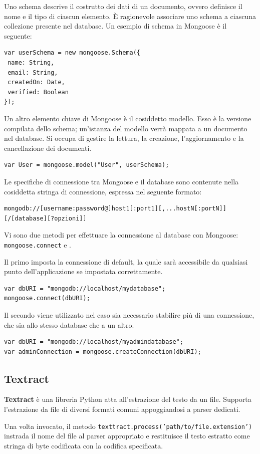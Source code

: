 Uno schema descrive il costrutto dei dati di un documento, ovvero definisce il nome e il tipo di ciascun elemento. È ragionevole associare uno schema a ciascuna collezione presente nel database. Un esempio di schema in Mongoose è il seguente:

\begin{lstlisting}
var userSchema = new mongoose.Schema({
 name: String,
 email: String,
 createdOn: Date,
 verified: Boolean
});
\end{lstlisting}

Un altro elemento chiave di Mongoose è il cosiddetto modello. Esso è la versione compilata dello schema; un'istanza del modello verrà mappata a un documento nel database. Si occupa di gestire la lettura, la creazione, l'aggiornamento e la cancellazione dei documenti.\cite{holmes}
\begin{lstlisting}
var User = mongoose.model("User", userSchema);
\end{lstlisting}

Le specifiche di connessione tra Mongoose e il database sono contenute nella cosiddetta stringa di connessione, espressa nel seguente formato:\cite{connection-string}
\begin{lstlisting}
mongodb://[username:password@]host1[:port1][,...hostN[:portN]][/[database][?opzioni]]
\end{lstlisting}

Vi sono due metodi per effettuare la connessione al database con Mongoose: \texttt{mongoose.connect} e .\cite{holmes-connection}

Il primo imposta la connessione di default, la quale sarà accessibile da qualsiasi punto dell'applicazione se impostata correttamente.
\begin{lstlisting}
var dbURI = "mongodb://localhost/mydatabase";
mongoose.connect(dbURI);
\end{lstlisting}
Il secondo viene utilizzato nel caso sia necessario stabilire più di una connessione, che sia allo stesso database che a un altro.
\begin{lstlisting}
var dbURI = "mongodb://localhost/myadmindatabase";
var adminConnection = mongoose.createConnection(dbURI);
\end{lstlisting}

\subsection{Textract}
\textbf{Textract} è una libreria Python atta all'estrazione del testo da un file. Supporta l'estrazione da file di diversi formati comuni appoggiandosi a parser dedicati.

Una volta invocato, il metodo \texttt{texttract.process('path/to/file.extension')} instrada il nome del file al parser appropriato e restituisce il testo estratto come stringa di byte codificata con la codifica specificata.\cite{textract}